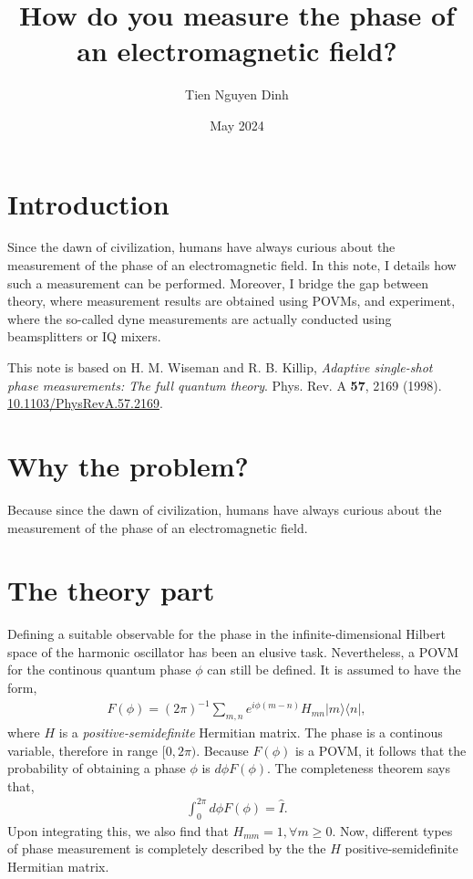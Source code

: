 \documentclass{article}
\title{How do you measure the phase of an electromagnetic field?}
\author{Tien Nguyen Dinh}
\date{May 2024}
\begin{document}
\maketitle

\section{Introduction}
Since the dawn of civilization, humans have always curious about the measurement of the phase of an electromagnetic field. In this note, I details how such a measurement can be performed. Moreover, I bridge the gap between theory, where measurement results are obtained using POVMs, and experiment, where the so-called dyne measurements are actually conducted using beamsplitters or IQ mixers. 

This note is based on H. M. Wiseman and R. B. Killip, \textit{Adaptive single-shot phase measurements: The full quantum theory}. Phys. Rev. A \textbf{57}, 2169 (1998). \href{https://journals.aps.org/pra/abstract/10.1103/PhysRevA.57.2169}{10.1103/PhysRevA.57.2169}.

\section{Why the problem?}
Because since the dawn of civilization, humans have always curious about the measurement of the phase of an electromagnetic field.

\section{The theory part}
Defining a suitable observable for the phase in the infinite-dimensional Hilbert space of the harmonic oscillator has been an elusive task. Nevertheless, a POVM for the continous quantum phase $\phi$ can still be defined. It is assumed to have the form,
\begin{align}
    F(\phi) = (2\pi)^{-1} \sum_{m,n} e^{i\phi(m-n)}H_{mn}|m\rangle\langle n |,
\end{align}
where $H$ is a \textit{positive-semidefinite} Hermitian matrix. The phase is a continous variable, therefore in range $[0,2\pi)$. Because $F(\phi)$ is a POVM, it follows that the probability of obtaining a phase $\phi$ is $d\phi F(\phi)$. The completeness theorem says that,
\begin{align}
    \int_{0}^{2\pi} d\phi F(\phi) = \hat{I}.
\end{align}
Upon integrating this, we also find that $H_{mm}=1,\forall m \geq 0$. Now, different types of phase measurement is completely described by the the $H$ positive-semidefinite Hermitian matrix. 
\end{document}
